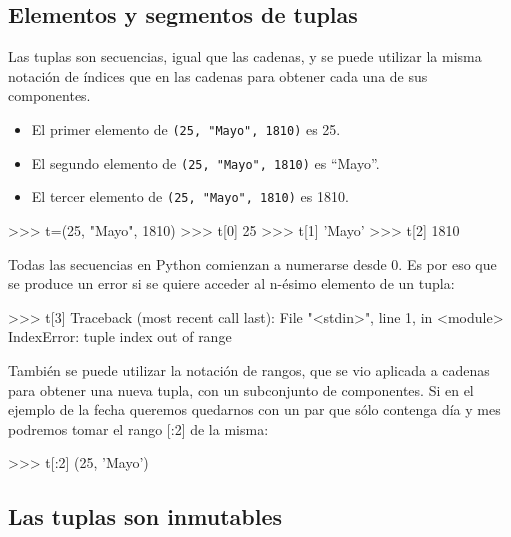 \subsection{Elementos y segmentos de tuplas}

Las tuplas son secuencias, igual que las cadenas, y se puede utilizar la
misma notación de índices que en las cadenas para obtener cada una de sus
componentes.

\begin{itemize}
\item El primer elemento de \lstinline!(25, "Mayo", 1810)! es 25.
\item El segundo elemento de \lstinline!(25, "Mayo", 1810)! es ``Mayo''.
\item El tercer elemento de \lstinline!(25, "Mayo", 1810)! es 1810.
\end{itemize}

\begin{codigo-python-sn}
>>> t=(25, "Mayo", 1810)
>>> t[0]
25
>>> t[1]
'Mayo'
>>> t[2]
1810
\end{codigo-python-sn}

\begin{atencion}
Todas las secuencias en Python comienzan a numerarse desde 0.  Es por eso
que se produce un error si se quiere acceder al n-ésimo elemento de un
tupla:

\begin{codigo-python-sn}
>>> t[3]
Traceback (most recent call last):
  File "<stdin>", line 1, in <module>
IndexError: tuple index out of range
\end{codigo-python-sn}
\end{atencion}

También se puede utilizar la notación de rangos, que se vio aplicada a
cadenas para obtener una nueva tupla, con un subconjunto de componentes. Si
en el ejemplo de la fecha queremos quedarnos con un par que sólo contenga
día y mes podremos tomar el rango [:2] de la misma:

\begin{codigo-python-sn}
>>> t[:2]
(25, 'Mayo')
\end{codigo-python-sn}


\subsection{Las tuplas son inmutables}

